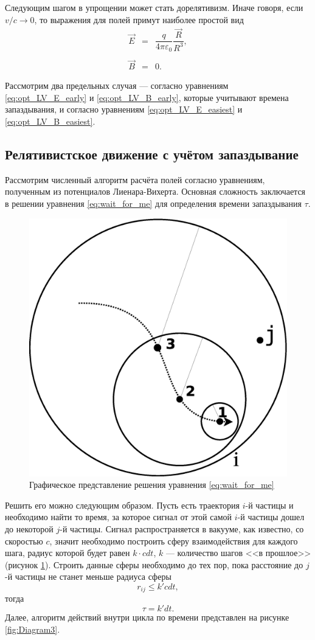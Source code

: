 Следующим шагом в упрощении может стать дорелятивизм. Иначе говоря, если
$v/c \to 0$,
то выражения для полей примут наиболее простой вид
\begin{eqnarray}
\vec{E} &=& \dfrac{q}{4 \pi \varepsilon_0}  \dfrac{ \vec{R} }{R^3}, \label{eq:opt_LV_E_easiest} \\ \nonumber \\
\vec{B} &=& 0.
\label{eq:opt_LV_B_easiest}
\end{eqnarray}


Рассмотрим два предельных случая --- согласно уравнениям \eqref{eq:opt_LV_E_early} и \eqref{eq:opt_LV_B_early}, которые учитывают времена запаздывания, и согласно уравнениям \eqref{eq:opt_LV_E_easiest} и \eqref{eq:opt_LV_B_easiest}.

\subsection{Релятивистское движение с учётом запаздывание}

Рассмотрим численный алгоритм расчёта полей согласно уравнениям, полученным из потенциалов Лиенара-Вихерта. Основная сложность заключается в решении уравнения \eqref{eq:wait_for_me} для определения времени запаздывания $\tau$.

\begin{figure}[h!]
\centering
\includegraphics[width=0.5\linewidth]{./fig/ch3/Diagram2tau}
\caption{Графическое представление решения уравнения \eqref{eq:wait_for_me}}
\label{fig:Diagram2tau}
\end{figure}

Решить его можно следующим образом. Пусть есть траектория $i$-й частицы и необходимо найти то время, за которое сигнал от этой самой $i$-й частицы дошел до некоторой $j$-й частицы. Сигнал распространяется в вакууме, как известно, со скоростью $c$, значит необходимо построить сферу взаимодействия для каждого шага, радиус которой будет равен $k \cdot cdt$, $k$ --- количество шагов <<в прошлое>> (рисунок \ref{fig:Diagram2tau}). Строить данные сферы необходимо до тех пор, пока расстояние до $j$-й частицы не станет меньше радиуса сферы
\begin{equation}
r_{ij} \leqslant k' c dt,
\end{equation}
тогда
\begin{equation}
\tau = k' dt.
\end{equation}
Далее, алгоритм действий внутри цикла по времени представлен на рисунке \ref{fig:Diagram3}.

